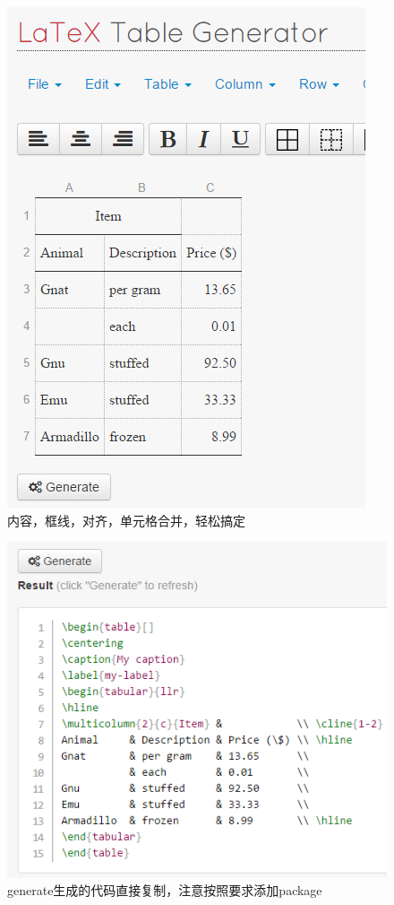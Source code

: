 \documentclass[12pt,a4paper,oneside]{book}
\begin{document}
{\begin{figure}[htp] 
\centering 
\includegraphics[scale=0.65]{Figures/tb.png}
\caption{内容，框线，对齐，单元格合并，轻松搞定~}%
\label{pic:tb}
\end{figure}

\par
\begin{figure}[htp] 
\centering 
\includegraphics[scale=0.65]{Figures/tb2.png}
\caption{generate生成的代码直接复制，注意按照要求添加package}%
\label{pic:tb2}
\end{figure}

}
\end{document}
